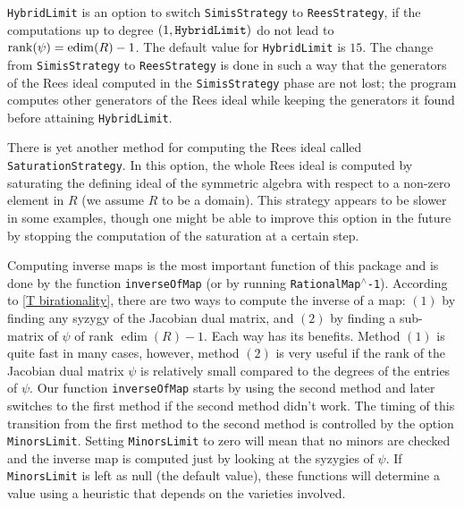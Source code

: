 \documentclass[11pt]{amsart}%
\numberwithin{equation}{theorem}
\renewcommand{\:}{\colon}
\DeclareMathOperator{\edim}{edim}
\theoremstyle{theorem}
\begin{document}
{\tt HybridLimit} is an option to switch   {\tt SimisStrategy} to  {\tt{ReesStrategy}}, if the computations up to degree $(1, \tt{HybridLimit})$ do not lead to   ${\rm rank}(\psi)=\edim(R)-1$.
The default value for {\tt HybridLimit} is $15$. The change from  {\tt SimisStrategy} to  {\tt ReesStrategy} is done in such a way that the generators of the Rees ideal computed in the { \tt SimisStrategy} phase are not lost; the program computes other generators of the Rees ideal while keeping the generators it found before attaining {\tt HybridLimit}.

There is yet another method for computing the Rees ideal called {\tt SaturationStrategy}. In this option, the whole Rees ideal is computed by saturating the defining ideal of the symmetric algebra with respect to a non-zero element in $R$ (we assume $R$ to be a domain). This strategy appears to be slower in some examples, though one might be able to  improve this option in the future by stopping the computation of the saturation at a certain step.

Computing inverse maps is the most important function of this package and is done by the function {\tt inverseOfMap} (or by running {\tt RationalMap{${}^\wedge$}-1}). According to \autoref{T birationality}, there are two ways to compute the inverse of a map: $(1)$ by finding any syzygy of the Jacobian dual matrix, and $(2)$ by finding a sub-matrix of $\psi$ of rank $\edim(R)-1$. Each way has its benefits. Method $(1)$ is quite fast in many cases, however, method $(2)$ is very useful if the rank of the Jacobian dual matrix  $\psi$ is relatively small compared to the degrees of the entries of $\psi$. Our function {\tt inverseOfMap} starts by using the second method and later switches to the first method if the second method didn't work.  The timing of this transition from the first method to the second method is controlled by the option {\tt MinorsLimit}. Setting {\tt MinorsLimit} to zero will mean that no minors are checked and the inverse map is computed just by looking at the syzygies of $\psi$.  If {\tt MinorsLimit} is left as null (the default value), these functions will determine a value using a heuristic that depends on the varieties involved.
\end{document}
